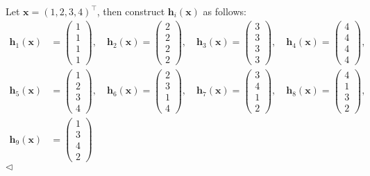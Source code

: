 \documentclass[11pt]{article}
\newenvironment{answer}[1][Answer]{\begin{trivlist}
\item[\hskip \labelsep {\bfseries #1.}\hskip \labelsep]}{\hfill$\lhd$\end{trivlist}}
\begin{document}
\begin{answer}
Let $\bm x=(1,2,3,4)^\top$, then construct $\bm h_i(\bm x)$ as follows:
\[
\begin{aligned}
\bm{h}_1(\bm{x}) &= 
\begin{pmatrix}
1 \\ 1 \\ 1 \\ 1
\end{pmatrix}, \quad
\bm{h}_2(\bm{x}) = 
\begin{pmatrix}
2 \\ 2 \\ 2 \\ 2
\end{pmatrix}, \quad
\bm{h}_3(\bm{x}) = 
\begin{pmatrix}
3 \\ 3 \\ 3 \\ 3
\end{pmatrix}, \quad
\bm{h}_4(\bm{x}) = 
\begin{pmatrix}
4 \\ 4 \\ 4 \\ 4
\end{pmatrix}, \\
\bm{h}_5(\bm{x}) &= 
\begin{pmatrix}
1 \\ 2 \\ 3 \\ 4
\end{pmatrix}, \quad
\bm{h}_6(\bm{x}) = 
\begin{pmatrix}
2 \\ 3 \\ 1 \\ 4
\end{pmatrix}, \quad
\bm{h}_7(\bm{x}) = 
\begin{pmatrix}
3 \\ 4 \\ 1 \\ 2
\end{pmatrix}, \quad
\bm{h}_8(\bm{x}) = 
\begin{pmatrix}
4 \\ 1 \\ 3 \\ 2
\end{pmatrix}, \\
\bm{h}_9(\bm{x}) &= 
\begin{pmatrix}
1 \\ 3 \\ 4 \\ 2

\end{pmatrix}
\end{aligned}\]
\end{answer}
\end{document}
